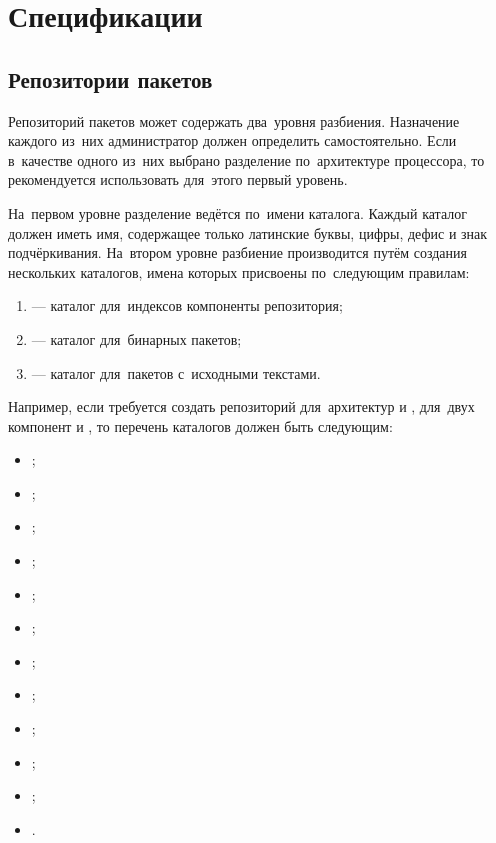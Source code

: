 
\section{Спецификации}

\subsection{Репозитории пакетов}
\label{repo_format}

Репозиторий пакетов \ds может содержать два~уровня разбиения.
Назначение каждого из~них администратор должен определить самостоятельно.
Если в~качестве одного из~них выбрано разделение по~архитектуре процессора, то рекомендуется использовать для~этого первый уровень.

На~первом уровне разделение ведётся по~имени каталога. 
Каждый каталог должен иметь имя, содержащее только латинские буквы, цифры, дефис и знак подчёркивания.
На~втором уровне разбиение производится путём создания нескольких каталогов,
имена которых присвоены по~следующим правилам:

\begin{enumerate}  

\item {
 --- каталог для~индексов компоненты репозитория;
}

\item {
 --- каталог для~бинарных пакетов;
}

\item {
 --- каталог для~пакетов с~исходными текстами.
}

\end{enumerate}

Например, если требуется создать репозиторий для~архитектур  и , 
для~двух компонент  и ,
то перечень каталогов должен быть следующим:

\begin{itemize}

\item{;}
\item{;}
\item{;}
\item{;}
\item{;}
\item{;}
\item{;}
\item{;}
\item{;}
\item{;}
\item{;}
\item{.}

\end{itemize}

